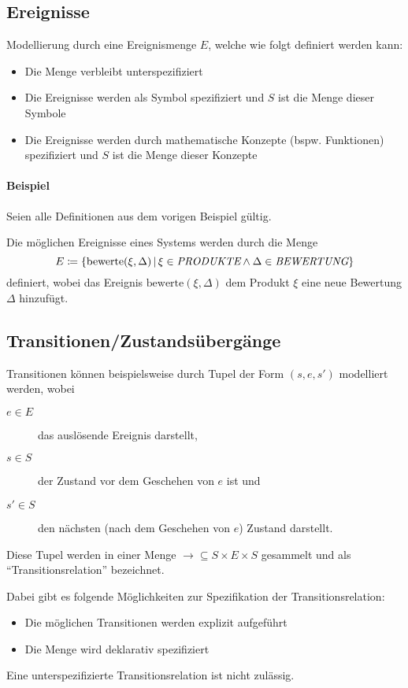 		\subsection{Ereignisse}
			Modellierung durch eine Ereignismenge $ E $, welche wie folgt definiert werden kann:
			\begin{itemize}
				\item Die Menge verbleibt unterspezifiziert
				\item Die Ereignisse werden als Symbol spezifiziert und $ S $ ist die Menge dieser Symbole
				\item Die Ereignisse werden durch mathematische Konzepte (bspw. Funktionen) spezifiziert und $ S $ ist die Menge dieser Konzepte
			\end{itemize}

			\paragraph{Beispiel}
				Seien alle Definitionen aus dem vorigen Beispiel gültig.

				Die möglichen Ereignisse eines Systems werden durch die Menge \[ E \coloneqq \{ \text{bewerte}(\xi, \Delta) \,\vert\, \xi \in \textit{PRODUKTE} \land \Delta \in \textit{BEWERTUNG} \} \] definiert, wobei das Ereignis $ \text{bewerte}(\xi, \Delta) $ dem Produkt $ \xi $ eine neue Bewertung $ \Delta $ hinzufügt.

		\subsection{Transitionen/Zustandsübergänge}
			Transitionen können beispielsweise durch Tupel der Form $ (s, e, s') $ modelliert werden, wobei
			\begin{description}
				\item[$ e \in E $] das auslösende Ereignis darstellt,
				\item[$ s \in S $] der Zustand vor dem Geschehen von $ e $ ist und
				\item[$ s' \in S $] den nächsten (nach dem Geschehen von $ e $) Zustand darstellt.
			\end{description}
			Diese Tupel werden in einer Menge $ \rightarrow \subseteq S \times E \times S $ gesammelt und als \enquote{Transitionsrelation} bezeichnet.

			Dabei gibt es folgende Möglichkeiten zur Spezifikation der Transitionsrelation:
			\begin{itemize}
				\item Die möglichen Transitionen werden explizit aufgeführt
				\item Die Menge wird deklarativ spezifiziert
			\end{itemize}
			Eine unterspezifizierte Transitionsrelation ist nicht zulässig.

